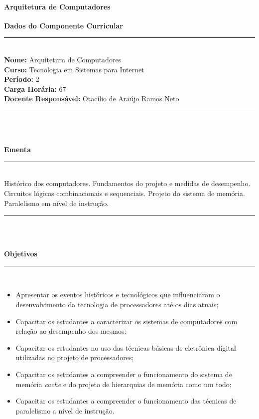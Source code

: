 \paragraph{Arquitetura de Computadores}

\begin{center}\textbf{Dados do Componente Curricular}\end{center}
\vspace{-5mm}
\noindent\rule{16.5cm}{0.4pt}
\\
\textbf{Nome:} Arquitetura de Computadores
\\ 
\textbf{Curso:} Tecnologia em Sistemas para Internet
\\ 
\textbf{Período:} \unit{2}{\degree}
\\ 
\textbf{Carga Horária:} \unit{67}{\hour}
\\ 
\textbf{Docente Responsável:} Otacílio de Araújo Ramos Neto
\\ 
\noindent\rule{16.5cm}{0.4pt}\\
\\
\vspace{-12mm}
\begin{center}\textbf{Ementa}\end{center}
\vspace{-5mm}
\noindent\rule{16.5cm}{0.4pt}
\\
Histórico dos computadores. Fundamentos do projeto e medidas de desempenho. Circuitos lógicos combinacionais e sequenciais. Projeto do sistema de memória. Paralelismo em nível de instrução. \\
\noindent\rule{16.5cm}{0.4pt}\\
\\
\vspace{-12mm}
\begin{center}\textbf{Objetivos}\end{center}
\vspace{-5mm}
\noindent\rule{16.5cm}{0.4pt}
\\
\begin{itemize}
\item Apresentar os eventos históricos e tecnológicos que influenciaram o desenvolvimento da tecnologia de processadores até os dias atuais;
\item Capacitar os estudantes a caracterizar os sistemas de computadores com relação ao desempenho dos mesmos;
\item Capacitar os estudantes no uso das técnicas básicas de eletrônica digital utilizadas no projeto de processadores;
\item Capacitar os estudantes a compreender o funcionamento do sistema de memória \textit{cache} e do projeto de hierarquias de memória como um todo;
\item Capacitar os estudantes a compreender o funcionamento das técnicas de paralelismo a nível de instrução.
\end{itemize} 
